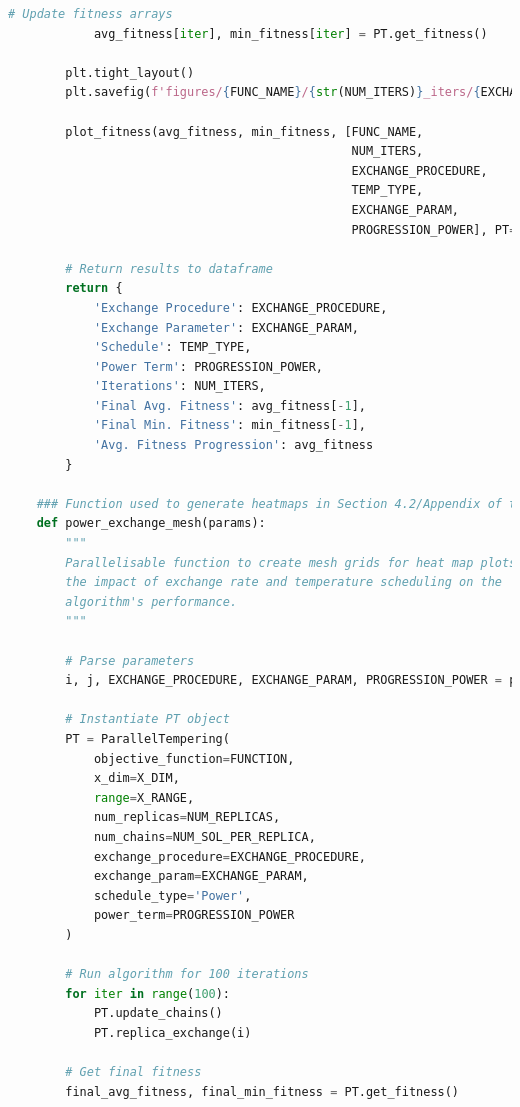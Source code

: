 \documentclass[10pt]{article}
\begin{document}
\begin{lstlisting}[language=Python, caption=PT\_TuningExperiments.py, label=PT_TuningExperimentspy]
            # Update fitness arrays
            avg_fitness[iter], min_fitness[iter] = PT.get_fitness()
    
        plt.tight_layout()
        plt.savefig(f'figures/{FUNC_NAME}/{str(NUM_ITERS)}_iters/{EXCHANGE_PROCEDURE}/{TEMP_TYPE}/{EXCHANGE_PARAM}_{PROGRESSION_POWER}_Solutions.png')
    
        plot_fitness(avg_fitness, min_fitness, [FUNC_NAME, 
                                                NUM_ITERS,
                                                EXCHANGE_PROCEDURE, 
                                                TEMP_TYPE, 
                                                EXCHANGE_PARAM, 
                                                PROGRESSION_POWER], PT=True)
    
        # Return results to dataframe
        return {
            'Exchange Procedure': EXCHANGE_PROCEDURE,
            'Exchange Parameter': EXCHANGE_PARAM,
            'Schedule': TEMP_TYPE,
            'Power Term': PROGRESSION_POWER,
            'Iterations': NUM_ITERS,
            'Final Avg. Fitness': avg_fitness[-1],
            'Final Min. Fitness': min_fitness[-1],
            'Avg. Fitness Progression': avg_fitness
        }
    
    ### Function used to generate heatmaps in Section 4.2/Appendix of the report ###
    def power_exchange_mesh(params):
        """
        Parallelisable function to create mesh grids for heat map plots to assess
        the impact of exchange rate and temperature scheduling on the
        algorithm's performance.
        """
    
        # Parse parameters
        i, j, EXCHANGE_PROCEDURE, EXCHANGE_PARAM, PROGRESSION_POWER = params
    
        # Instantiate PT object
        PT = ParallelTempering(
            objective_function=FUNCTION,
            x_dim=X_DIM,
            range=X_RANGE,
            num_replicas=NUM_REPLICAS,
            num_chains=NUM_SOL_PER_REPLICA,
            exchange_procedure=EXCHANGE_PROCEDURE,
            exchange_param=EXCHANGE_PARAM,
            schedule_type='Power',
            power_term=PROGRESSION_POWER
        )
    
        # Run algorithm for 100 iterations
        for iter in range(100):
            PT.update_chains()
            PT.replica_exchange(i)
    
        # Get final fitness
        final_avg_fitness, final_min_fitness = PT.get_fitness()
    

\end{lstlisting}
\end{document}
